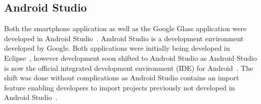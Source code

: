 

\subsection{Android Studio}
Both the smartphone application as well as the Google Glass application were developed in Android Studio~\cite{androidStudio}. Android Studio is a development environment developed by Google. Both applications were initially being developed in Eclipse~\cite{eclipse}, however development soon shifted to Android Studio as Android Studio is now the official integrated development environment (IDE) for Android~\cite{androidIDE}. The shift was done without complications as Android Studio contains an import feature enabling developers to import projects previously not developed in Android Studio~\cite{androidIDE}.%







